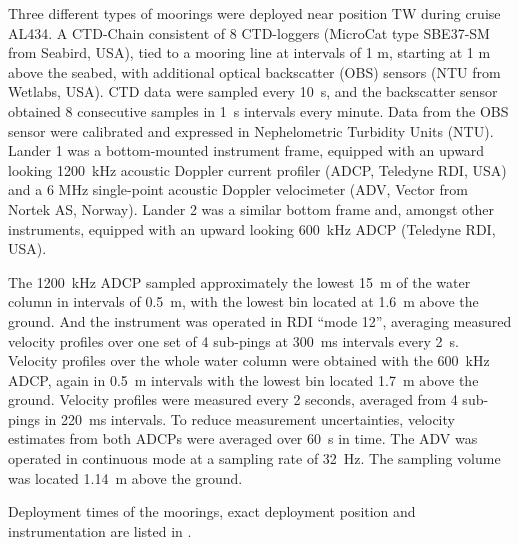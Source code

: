 Three different types of moorings were deployed near position TW during cruise 
AL434. A CTD-Chain consistent of 8 CTD-loggers (MicroCat type SBE37-SM from 
Seabird, USA), tied to a mooring line at intervals of 1 m, starting at 1 m above 
the seabed, with additional optical backscatter (OBS) sensors (NTU from 
Wetlabs, USA). CTD data were sampled every 10~s, and the backscatter sensor 
obtained 8 consecutive samples in 1~s intervals every minute. Data from the OBS 
sensor were calibrated and expressed in Nephelometric Turbidity Units (NTU).
Lander 1 was a bottom-mounted instrument frame, equipped with an upward looking 
1200~kHz acoustic Doppler current profiler (ADCP, Teledyne RDI, USA) and a 6 
MHz single-point acoustic Doppler velocimeter (ADV, Vector from Nortek AS, 
Norway).
Lander 2 was a similar bottom frame and, amongst other instruments, equipped 
with an upward looking 600~kHz ADCP (Teledyne RDI, USA).

The 1200~kHz ADCP sampled approximately the lowest 15~m of the water column in 
intervals of 0.5~m, with the lowest bin located at 1.6~m above the ground. 
And the instrument was operated in RDI ``mode 12'', 
averaging measured velocity profiles over one set of 4 sub-pings at 300~ms 
intervals every 2~s. 
Velocity profiles over the whole water column were 
obtained with the 600~kHz ADCP, again in 0.5~m intervals with the lowest bin 
located 1.7~m above the ground. Velocity profiles were measured every 2 
seconds, 
averaged from 4 sub-pings in 220~ms intervals. To reduce measurement 
uncertainties, velocity estimates from both ADCPs were averaged over 60~s in 
time. 
The ADV was operated in continuous mode at a sampling rate of 32~Hz. The 
sampling volume was located 1.14~m above the ground.

Deployment times of the moorings, exact deployment position and instrumentation 
are listed in .

